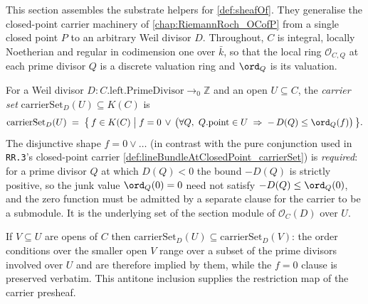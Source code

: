 This section assembles the substrate helpers for \cref{def:sheafOf}.
They generalise the closed-point carrier machinery of
\cref{chap:RiemannRoch_OCofP} from a single closed point \(P\) to an
arbitrary Weil divisor \(D\). Throughout, \(C\) is integral, locally
Noetherian and regular in codimension one over \(\bar k\), so that the
local ring \(\mathcal O_{C, Q}\) at each prime divisor \(Q\) is a
discrete valuation ring and \(\ord_Q\) is its valuation.

\begin{definition}

  \label{def:sheafOf_carrierSet}
  For a Weil divisor \(D : C.\text{left.PrimeDivisor} \to_0 \mathbb Z\) and
  an open \(U \subseteq C\), the \emph{carrier set}
  \(\mathrm{carrierSet}_D(U) \subseteq K(C)\) is
  \[
    \mathrm{carrierSet}_D(U) \;=\;
    \bigl\{\, f \in K(C) \;\big|\;
      f = 0 \,\lor\,
      \bigl(\forall Q,\ Q.\mathrm{point} \in U \;\Rightarrow\;
        -\,D(Q) \le \ord_Q(f)\bigr) \,\bigr\}.
  \]
  The disjunctive shape \(f = 0 \lor \dots\) (in contrast with the pure
  conjunction used in \texttt{RR.3}'s closed-point carrier
  \cref{def:lineBundleAtClosedPoint_carrierSet}) is \emph{required}: for a
  prime divisor \(Q\) at which \(D(Q) < 0\) the bound \(-D(Q)\) is strictly
  positive, so the junk value \(\ord_Q(0) = 0\) need not satisfy
  \(-D(Q) \le \ord_Q(0)\), and the zero function must be admitted by a
  separate clause for the carrier to be a submodule. It is the underlying
  set of the section module of \(\mathcal O_C(D)\) over \(U\).
\end{definition}

\begin{lemma}

  \label{lem:sheafOf_carrierSet_mono}
  If \(V \subseteq U\) are opens of \(C\) then
  \(\mathrm{carrierSet}_D(U) \subseteq \mathrm{carrierSet}_D(V)\): the order
  conditions over the smaller open \(V\) range over a subset of the prime
  divisors involved over \(U\) and are therefore implied by them, while the
  \(f = 0\) clause is preserved verbatim. This antitone inclusion supplies
  the restriction map of the carrier presheaf.
\end{lemma}

